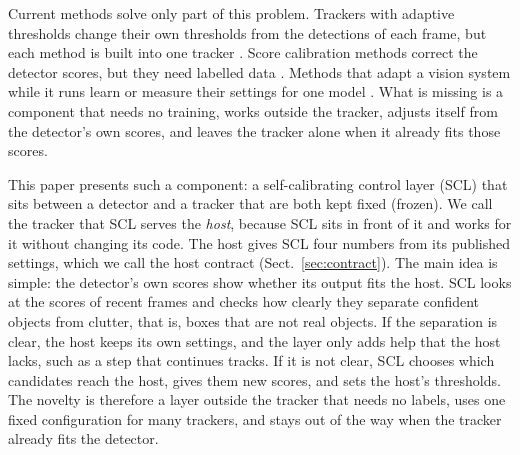 \documentclass[pdflatex,sn-mathphys-num,iicol]{sn-jnl}
\newcommand{\scl}{SCL}
\begin{document}
Current methods solve only part of this problem. Trackers with adaptive
thresholds change their own thresholds from the detections of each frame, but
each method is built into one tracker
\cite{ma2023adaptivebytetrack,shim2024adaptrack,act2026adaptive}. Score
calibration methods correct the detector scores, but they need labelled data
\cite{kuppers2020detcalib}. Methods that adapt a vision system while it runs
learn or measure their settings for one model
\cite{han2022dynamic,jiang2018chameleon}. What is missing is a component that
needs no training, works outside the tracker, adjusts itself from the
detector's own scores, and leaves the tracker alone when it already fits those
scores.

This paper presents such a component: a self-calibrating control layer
(\scl{}) that sits between a detector and a tracker that are both kept fixed
(frozen). We call the tracker that \scl{} serves the \emph{host}, because
\scl{} sits in front of it and works for it without changing its code. The
host gives \scl{} four numbers from its published settings, which we call the
host contract (Sect.~\ref{sec:contract}). The main idea is simple: the
detector's own scores show whether its output fits the host. \scl{} looks at
the scores of recent frames and checks how clearly they separate confident
objects from clutter, that is, boxes that are not real objects. If the
separation is clear, the host keeps its own settings, and the layer only adds
help that the host lacks, such as a step that continues tracks. If it is not
clear, \scl{} chooses which candidates reach the host, gives them new scores,
and sets the host's thresholds. The novelty is therefore a layer outside the
tracker that needs no labels, uses one fixed configuration for many trackers,
and stays out of the way when the tracker already fits the detector.
\end{document}
